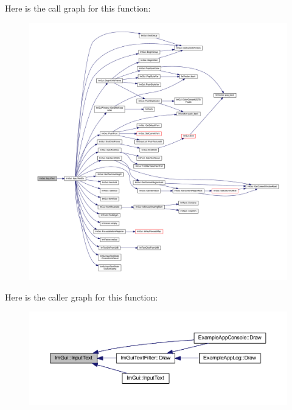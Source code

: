 Here is the call graph for this function\+:
\nopagebreak
\begin{figure}[H]
\begin{center}
\leavevmode
\includegraphics[width=350pt]{namespace_im_gui_aa72b5760a3a206729723a587ac7c8519_cgraph}
\end{center}
\end{figure}
Here is the caller graph for this function\+:
\nopagebreak
\begin{figure}[H]
\begin{center}
\leavevmode
\includegraphics[width=350pt]{namespace_im_gui_aa72b5760a3a206729723a587ac7c8519_icgraph}
\end{center}
\end{figure}
\mbox{\label{namespace_im_gui_acc8cda7bb7c80b9dd36bc394723d1606}} 
